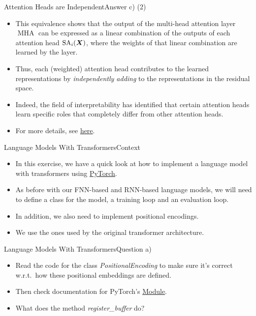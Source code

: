 \documentclass[t]{beamer}
\newcommand\op[1]{\operatorname{#1}}
\begin{document}
\begin{frame}{Attention Heads are Independent}{Answer c) (2)}
    \begin{itemize}
        \item This equivalence shows that the output of the multi-head attention
              layer $\op{MHA}$ can be expressed as a linear combination of the
              outputs of each attention head $\op{SA}_i(\mX)$, where the weights
              of that linear combination are learned by the layer.
        \item Thus, each (weighted) attention head contributes to the
              learned representations by \emph{independently adding} to the 
              representations in the residual space.
        \item Indeed, the field of interpretability has identified that certain
              attention heads learn specific roles that completely differ from 
              other attention heads.
        \item For more details, see 
        \href{https://transformer-circuits.pub/2021/framework/index.html}{here}.
    \end{itemize}
\end{frame}

\begin{frame}{Language Models With Transformers}{Context}
    \begin{itemize}
        \item In this exercise, we have a quick look at how to implement a
              language model with transformers using
              \href{https://pytorch.org/}{PyTorch}.
        \item As before with our FNN-based and RNN-based language models, we
              will need to define a class for the model, a training loop and an
              evaluation loop.
        \item In addition, we also need to implement positional encodings.
        \item We use the ones used by the original transformer architecture.
    \end{itemize}
\end{frame}

\begin{frame}{Language Models With Transformers}{Question a)}
    \begin{itemize}
        \item Read the code for the class \emph{PositionalEncoding} to make sure
              it's correct w.r.t.\ how these positional embeddings are defined.
        \item Then check documentation for PyTorch's
              \href{https://pytorch.org/docs/stable/generated/torch.nn.Module.html}{Module}.
        \item What does the method \emph{register\_buffer} do?
    \end{itemize}
\end{frame}
\end{document}
